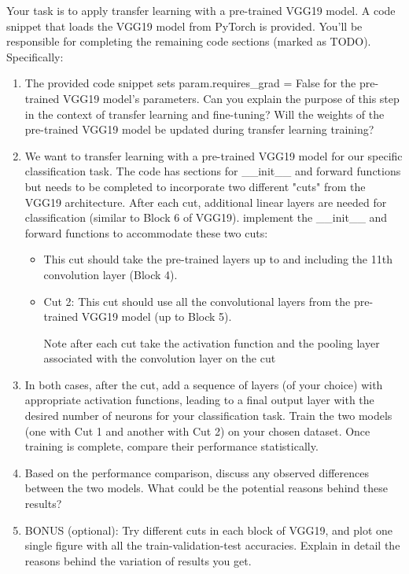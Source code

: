 \documentclass[11pt]{scrartcl}
\begin{document}
Your task is to apply transfer learning with a pre-trained VGG19 model. A code snippet that loads the VGG19 model from PyTorch is provided. You'll be responsible for completing the remaining code sections (marked as TODO). Specifically:

\begin{enumerate}
    \item The provided code snippet sets param.requires\_grad = False for the pre-trained VGG19 model's parameters. Can you explain the purpose of this step in the context of transfer learning and fine-tuning? Will the weights of the pre-trained VGG19 model be updated during transfer learning training?

    \item We want to transfer learning with a pre-trained VGG19 model for our specific classification task. The code has sections for \_\_init\_\_ and forward functions but needs to be completed to incorporate two different "cuts" from the VGG19 architecture. After each cut, additional linear layers are needed for classification (similar to Block 6 of VGG19).
implement the \_\_init\_\_ and forward functions to accommodate these two cuts:
\begin{itemize}
    \item This cut should take the pre-trained layers up to and including the 11th convolution layer (Block 4).

    \item Cut 2: This cut should use all the convolutional layers from the pre-trained VGG19 model (up to Block 5).
    
Note after each cut take the activation function and the pooling layer associated with the convolution layer on the cut

\end{itemize}

\item In both cases, after the cut, add a sequence of layers (of your choice) with appropriate activation functions, leading to a final output layer with the desired number of neurons for your classification task.
Train the two models (one with Cut 1 and another with Cut 2) on your chosen dataset. Once training is complete, compare their performance statistically.

\item Based on the performance comparison, discuss any observed differences between the two models. What could be the potential reasons behind these results?

\item BONUS (optional): Try different cuts in each block of VGG19, and plot one single figure with all the train-validation-test accuracies. Explain in detail the reasons behind the variation of results you get.
\end{enumerate}
\end{document}
